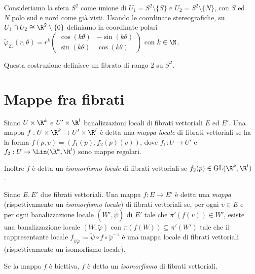 \begin{example}
	Consideriamo la sfera $S^2$ come unione di $U_1 = S^2\setminus \{S\}$ e $U_2 = S^2\setminus \{N\}$, con $S$ ed $N$ polo sud e nord come già visti. Usando le coordinate stereografiche, su $U_1\cap U_2\cong \R^2\setminus\{0\}$ definiamo in coordinate polari $\tilde\varphi_{21}(r,\theta) = r^k \left(\begin{matrix} \cos(k\theta)& -\sin(k\theta)\\ \sin(k\theta)& \cos(k\theta) \end{matrix}\right)$ con $k\in\N$.
	
	Questa costruzione definisce un fibrato di rango 2 su $S^2$.
\end{example}


\section{Mappe fra fibrati}

\begin{definition}  
	Siano $U\times\R^k$ e $U'\times\R^l$ banalizzazioni locali di fibrati vettoriali $E$ ed $E'$. Una mappa $f:U\times\R^k\to U'\times\R^l$ è detta una \emph{mappa locale} di fibrati vettoriali se ha la forma $f(p,v) = (f_1(p), f_2(p)(v) )$, dove $f_1:U\to U'$ e $f_2:U \to \Lin(\R^k,\R^l)$ sono mappe regolari.
	
	Inoltre $f$ è detta un \emph{isomorfismo locale} di fibrati vettoriali se $f_2(p)\in \mathrm{GL}(\R^k,\R^l)$.
\end{definition}


\begin{definition}  
	Siano $E,E'$ due fibrati vettoriali. Una mappa $f:E \to E'$ è detta una \emph{mappa} (rispettivamente un \emph{isomorfismo locale}) di fibrati vettoriali se, per ogni $v \in E$ e per ogni banalizzazione locale $(W',\tilde\psi)$ di $E'$ tale che $\pi'(f(v))\in W'$, esiste una banalizzazione locale $(W,\tilde\varphi)$ con $\pi(f(W))\subseteq \pi'(W')$ tale che il rappresentante locale $f_{\tilde\psi\tilde\varphi}\coloneqq \tilde\psi\circ f \circ \tilde\varphi^{-1}$ è una mappa locale di fibrati vettoriali (rispettivamente un isomorfismo locale).
	
	Se la mappa $f$ è biettiva, $f$ è detta un \emph{isomorfismo} di fibrati vettoriali.
\end{definition}


